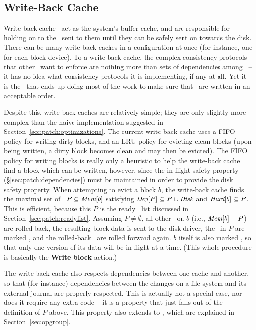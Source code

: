 \subsection{Write-Back Cache}
\label{sec:using:wbcache}

Write-back cache \modules\ act as the system's buffer cache, and are responsible
for holding on to the \chdescs\ sent to them until they can be safely sent on
towards the disk. There can be many write-back caches in a configuration at once
(for instance, one for each block device). To a write-back cache, the complex
consistency protocols that other \modules\ want to enforce are nothing more than
sets of dependencies among \chdescs\ -- it has no idea what consistency
protocols it is implementing, if any at all. Yet it is the \module\ that ends up
doing most of the work to make sure that \chdescs\ are written in an acceptable
order.

Despite this, write-back caches are relatively simple; they are only slightly
more complex than the naive implementation suggested in
Section~\ref{sec:patch:optimizations}. The current write-back cache uses a FIFO
policy for writing dirty blocks, and an LRU policy for evicting clean blocks
(upon being written, a dirty block becomes clean and may then be evicted).
%
The FIFO policy for writing blocks is really only a heuristic to help the
write-back cache find a block which can be written, however, since the in-flight
safety property (\S\ref{sec:patch:dependencies}) must be maintained in order to
provide the disk safety property. When attempting to evict a block $b$, the
write-back cache finds the maximal set of \chdescs\ $P \subseteq \PMem[b]$
satisfying
%
$\PDepset{P} \subseteq P \cup \PDisk$ and $\PHard[b] \subseteq P$.
%
This is efficient, because this $P$ is the ready \chdesc\ list discussed in
Section~\ref{sec:patch:readylist}.
%
Assuming $P \neq \emptyset$, all other \chdescs\ on $b$ (i.e., $\PMem[b] - P$)
are rolled back, the resulting block data is sent to the disk driver, the
\chdescs\ in $P$ are marked \PInfst, and the rolled-back \chdescs\ are rolled
forward again. $b$ itself is also marked \PInfst, so that only one version of
its data will be in flight at a time. (This whole procedure is basically the
\textbf{Write block} action.)

The write-back cache also respects dependencies between one cache and another,
so that (for instance) dependencies between the changes on a file system and its
external journal are properly respected. This is actually not a special case,
nor does it require any extra code -- it is a property that just falls out of
the definition of $P$ above. This property also extends to \opgroups, which are
explained in Section~\ref{sec:opgroup}.
